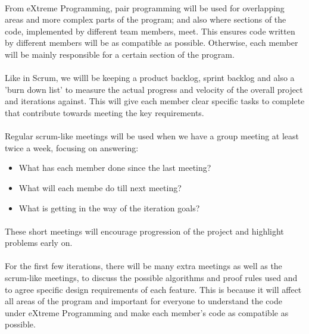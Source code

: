 \paragraph{}
From eXtreme Programming, pair programming will be used for overlapping areas and more complex parts of the program; and also where sections of the code, implemented by different team members, meet. This ensures code written by different members will be as compatible as possible. Otherwise, each member will be mainly responsible for a certain section of the program.

\paragraph{}
Like in Scrum, we willl be keeping a product backlog, sprint backlog and also a 'burn down list' to measure the actual progress and velocity of the overall project and iterations against. This will give each member clear specific tasks to complete that contribute towards meeting the key requirements.

\paragraph{}
Regular scrum-like meetings will be used when we have a group meeting at least twice a week, focusing on answering:
\begin{itemize}
\item What has each member done since the last meeting?
\item What will each membe do till next meeting?
\item What is getting in the way of the iteration goals?
\end{itemize}

\paragraph{}
These short meetings will encourage progression of the project and highlight problems early on.

\paragraph{}
For the first few iterations, there will be many extra meetings as well as the scrum-like meetings, to discuss the possible algorithms and proof rules used and to agree specific design requirements of each feature. This is because it will affect all areas of the program and important for everyone to understand the code under eXtreme Programming and make each member's code as compatible as possible.

